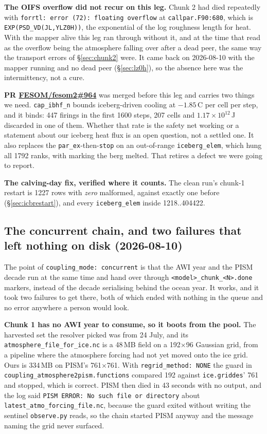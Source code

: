 \documentclass[11pt,a4paper]{article}
\newcommand{\code}[1]{\texttt{\small #1}}
\begin{document}
\medskip\noindent
\textbf{The OIFS overflow did not recur on this leg.} Chunk 2 had died repeatedly with
\code{forrtl: error (72): floating overflow} at \code{callpar.F90:680}, which is
\code{EXP(PSD\_VD(JL,YLZ0H))}, the exponential of the log roughness length for heat. With the
mapper alive this leg ran through without it, and at the time that read as the overflow being the
atmosphere falling over after a dead peer, the same way the transport errors of
\S\ref{sec:chunk2} were. It came back on 2026-08-10 with the mapper running and no dead peer
(\S\ref{sec:lz0h}), so the absence here was the intermittency, not a cure.

\medskip\noindent
\textbf{PR \href{https://github.com/FESOM/fesom2/pull/964}{FESOM/fesom2\#964}} was merged before
this leg and carries two things we need. \code{cap\_ibhf\_n} bounds iceberg-driven cooling at
$-1.85$\,\textdegree C per cell per step, and it binds: 447 firings in the first 1600 steps, 207
cells and $1.17\times10^{12}$\,J discarded in one of them. Whether that rate is the safety net
working or a statement about our iceberg heat flux is an open question, not a settled one. It also
replaces the \code{par\_ex}-then-\code{stop} on an out-of-range \code{iceberg\_elem}, which hung all
1792 ranks, with marking the berg melted. That retires a defect we were going to report.

\medskip\noindent
\textbf{The calving-day fix, verified where it counts.} The clean run's chunk-1 restart is 1227
rows with \emph{zero} malformed, against exactly one before (\S\ref{sec:icbrestart}), and every
\code{iceberg\_elem} inside 1218..404422.

\subsection{The concurrent chain, and two failures that left nothing on disk (2026-08-10)}
\label{sec:concurrent}

The point of \code{coupling\_mode: concurrent} is that the AWI year and the PISM decade run at the
same time and hand over through \code{<model>\_chunk\_<N>.done} markers, instead of the decade
serialising behind the ocean year. It works, and it took two failures to get there, both of which
ended with nothing in the queue and no error anywhere a person would look.

\medskip\noindent
\textbf{Chunk 1 has no AWI year to consume, so it boots from the pool.} The harvested set the
resolver picked was from 24 July, and its \code{atmosphere\_file\_for\_ice.nc} is a 48\,MB field on
a 192$\times$96 Gaussian grid, from a pipeline where the atmosphere forcing had not yet moved onto
the ice grid. Ours is 334\,MB on PISM's 761$\times$761. With \code{regrid\_method: NONE} the guard
in \code{coupling\_atmosphere2pism.functions} compared 192 against \code{ice.griddes}' 761 and
stopped, which is correct. PISM then died in 43 seconds with no output, and the log said
\code{PISM ERROR: No such file or directory} about \code{latest\_atmo\_forcing\_file.nc}, because
the guard exited without writing the sentinel \code{observe.py} reads, so the chain started PISM
anyway and the message naming the grid never surfaced.
\end{document}
